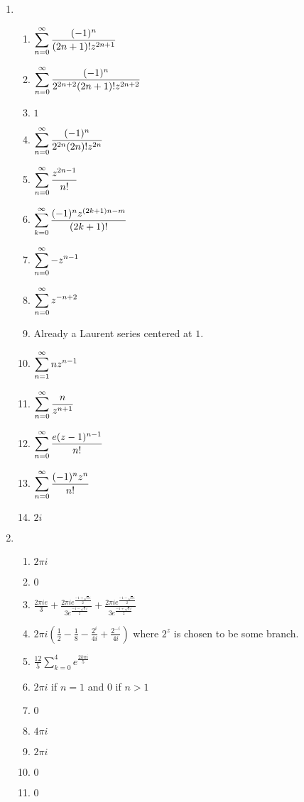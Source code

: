 \begin{enumerate}
	\item	\begin{enumerate}
		\item $\displaystyle \sum_{n = 0}^\infty \frac{(-1)^n}{(2n+1)!z^{2n+1}}$
		\item $\displaystyle \sum_{n = 0}^\infty \frac{(-1)^n}{2^{2n+2}(2n+1)!z^{2n+2}}$
		\item $1$
		\item $\displaystyle \sum_{n = 0}^\infty \frac{(-1)^n}{2^{2n}(2n)!z^{2n}}$
		\item $\displaystyle \sum_{n = 0}^\infty \frac{z^{2n-1}}{n!}$
		\item $\displaystyle \sum_{k = 0}^\infty \frac{(-1)^n z^{(2k+1)n-m}}{(2k+1)!}$
		\item $\displaystyle \sum_{n = 0}^\infty -z^{n-1}$
		\item $\displaystyle \sum_{n = 0}^\infty z^{-n+2}$
		\item Already a Laurent series centered at $1$.
		\item $\displaystyle \sum_{n = 1}^\infty nz^{n-1}$
		\item $\displaystyle \sum_{n = 0}^\infty \frac{n}{z^{n+1}}$
		\item $\displaystyle \sum_{n = 0}^\infty \frac{e(z-1)^{n-1}}{n!}$
		\item $\displaystyle \sum_{n = 0}^\infty \frac{(-1)^nz^n}{n!}$
		\item $2i$
	\end{enumerate}
	
	
	\item \begin{enumerate}
		\item $2\pi i$
		\item $0$
		\item $\frac{2\pi i e}{3} + \frac{2\pi i e^{\frac{-1 + \sqrt{3}i}{2}}}{3e^{\frac{-1 - \sqrt{3}i}{2}}} + \frac{2\pi i e^{\frac{-1 - \sqrt{3}i}{2}}}{3e^{\frac{-1 + \sqrt{3}i}{2}}}$
		\item $2\pi i \left( \frac{1}{2} -\frac{1}{8} - \frac{2^i}{4i} + \frac{2^{-i}}{4i}\right)$ where $2^z$ is chosen to be some branch.
		\item $\frac{12}{5} \sum_{k = 0}^4 e^{\frac{2k \pi i}{5}}$
		\item $2\pi i$ if $n = 1$ and $0$ if $n  > 1$		
		\item $0$
		\item $4\pi i$
		\item $2\pi i$
		\item $0$
		\item $0$
	\end{enumerate}
	

\end{enumerate}
